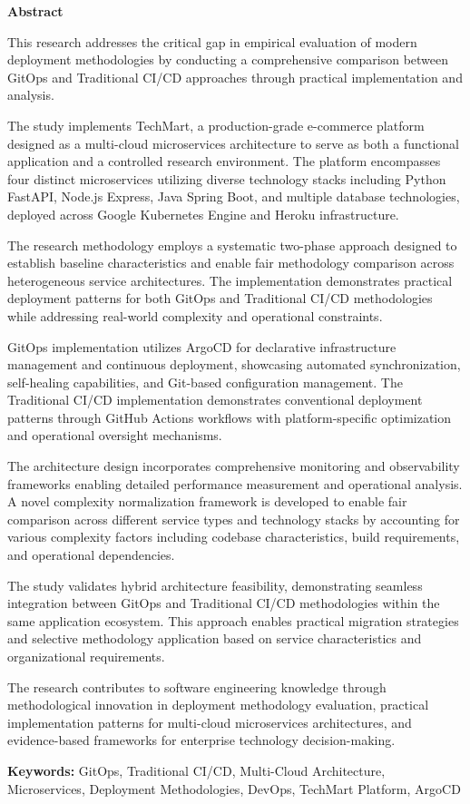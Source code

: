 \thispagestyle{empty}

\begin{center}
{\Large \textbf{Abstract}}
\end{center}

\vspace{1cm}

This research addresses the critical gap in empirical evaluation of modern deployment methodologies by conducting a comprehensive comparison between GitOps and Traditional CI/CD approaches through practical implementation and analysis.

The study implements TechMart, a production-grade e-commerce platform designed as a multi-cloud microservices architecture to serve as both a functional application and a controlled research environment. The platform encompasses four distinct microservices utilizing diverse technology stacks including Python FastAPI, Node.js Express, Java Spring Boot, and multiple database technologies, deployed across Google Kubernetes Engine and Heroku infrastructure.

The research methodology employs a systematic two-phase approach designed to establish baseline characteristics and enable fair methodology comparison across heterogeneous service architectures. The implementation demonstrates practical deployment patterns for both GitOps and Traditional CI/CD methodologies while addressing real-world complexity and operational constraints.

GitOps implementation utilizes ArgoCD for declarative infrastructure management and continuous deployment, showcasing automated synchronization, self-healing capabilities, and Git-based configuration management. The Traditional CI/CD implementation demonstrates conventional deployment patterns through GitHub Actions workflows with platform-specific optimization and operational oversight mechanisms.

The architecture design incorporates comprehensive monitoring and observability frameworks enabling detailed performance measurement and operational analysis. A novel complexity normalization framework is developed to enable fair comparison across different service types and technology stacks by accounting for various complexity factors including codebase characteristics, build requirements, and operational dependencies.

The study validates hybrid architecture feasibility, demonstrating seamless integration between GitOps and Traditional CI/CD methodologies within the same application ecosystem. This approach enables practical migration strategies and selective methodology application based on service characteristics and organizational requirements.

The research contributes to software engineering knowledge through methodological innovation in deployment methodology evaluation, practical implementation patterns for multi-cloud microservices architectures, and evidence-based frameworks for enterprise technology decision-making.

\textbf{Keywords:} GitOps, Traditional CI/CD, Multi-Cloud Architecture, Microservices, Deployment Methodologies, DevOps, TechMart Platform, ArgoCD

\newpage

\newpage